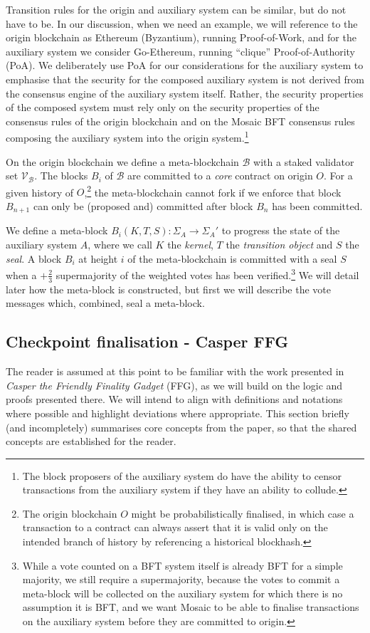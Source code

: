 \documentclass[12pt,a4paper]{article}
\begin{document}
Transition rules for the origin and auxiliary system can be similar, but do not have to be.
In our discussion, when we need an example, we will reference to the origin blockchain as Ethereum (Byzantium), running Proof-of-Work, and for the auxiliary system we consider Go-Ethereum, running ``clique'' Proof-of-Authority (PoA).
We deliberately use PoA for our considerations for the auxiliary system to emphasise that the security for the composed auxiliary system is not derived from the consensus engine of the auxiliary system itself.
Rather, the security properties of the composed system must rely only on the security properties of the consensus rules of the origin blockchain and on the Mosaic BFT consensus rules composing the auxiliary system into the origin system.\footnote{
	The block proposers of the auxiliary system do have the ability to censor transactions from the auxiliary system if they have an ability to collude.
}

On the origin blockchain we define a meta-blockchain $\mathcal{B}$ with a staked validator set $\mathcal{V}_\mathcal{B}$. The blocks $B_i$ of $\mathcal{B}$ are committed to a \emph{core} contract on origin $O$.
For a given history of $O$,\footnote{
	The origin blockchain $O$ might be probabilistically finalised, in which case a transaction to a contract can always assert that it is valid only on the intended branch of history by referencing a historical blockhash.
}
the meta-blockchain cannot fork if we enforce that block $B_{n+1}$ can only be (proposed and) committed after block $B_n$ has been committed.

We define a meta-block $B_i(K, T, S): \Sigma_A \rightarrow \Sigma_A'$ to progress the state of the auxiliary system $A$, where we call $K$ the \emph{kernel}, $T$ the \emph{transition object} and $S$ the \emph{seal}.
A block $B_i$ at height $i$ of the meta-blockchain is committed with a seal $S$ when a $+\tfrac{2}{3}$ supermajority of the weighted votes has been verified.\footnote{
	While a vote counted on a BFT system itself is already BFT for a simple majority, %
	we still require a supermajority, because the votes to commit a meta-block will be collected on the auxiliary system for which there is no assumption it is BFT, and we want Mosaic to be able to finalise transactions on the auxiliary system before they are committed to origin.
}
We will detail later how the meta-block is constructed, but first we will describe the vote messages which, combined, seal a meta-block.

\subsection{Checkpoint finalisation - Casper FFG}
The reader is assumed at this point to be familiar with the work presented in \textit{Casper the Friendly Finality Gadget}\cite{casperffg} (FFG), as we will build on the logic and proofs presented there.
We will intend to align with definitions and notations where possible and highlight deviations where appropriate.
This section briefly (and incompletely) summarises core concepts from the paper, so that the shared concepts are established for the reader.
\end{document}
